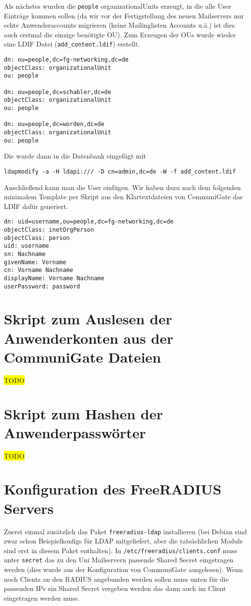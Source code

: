 \documentclass[11pt,a4paper,titlepage=firstiscover,headsepline,bibtotoc]{scrartcl} %
\newcommand{\hilight}[1]{\colorbox{yellow}{#1}} %
\begin{document}
Als nächstes wurden die \texttt{people} organizationalUnits erzeugt, in die alle User Einträge kommen sollen (da wir vor der Fertigstellung des neuen Mailservers nur echte Anwenderaccounts migrieren (keine Mailinglisten Accounts u.ä.) ist dies auch erstmal die einzige benötigte OU). Zum Erzeugen der OUs wurde wieder eine LDIF Datei (\texttt{add\_content.ldif}) erstellt.
\begin{lstlisting}
dn: ou=people,dc=fg-networking,dc=de
objectClass: organizationalUnit
ou: people

dn: ou=people,dc=schabler,dc=de
objectClass: organizationalUnit
ou: people

dn: ou=people,dc=worden,dc=de
objectClass: organizationalUnit
ou: people
\end{lstlisting}
Die wurde dann in die Datenbank eingefügt mit
\begin{lstlisting}
ldapmodify -a -H ldapi:/// -D cn=admin,dc=de -W -f add_content.ldif
\end{lstlisting}
Anschließend kann man die User einfügen. Wir haben dazu nach dem folgenden minimalem Template per Skript aus den Klartextdateien von CommuniGate das LDIF dafür generiert.
\begin{lstlisting}
dn: uid=username,ou=people,dc=fg-networking,dc=de
objectClass: inetOrgPerson
objectClass: person
uid: username
sn: Nachname
givenName: Vorname
cn: Vorname Nachname
displayName: Vorname Nachname
userPassword: password
\end{lstlisting}

\newpage
\section{Skript zum Auslesen der Anwenderkonten aus der CommuniGate Dateien}\label{sec:SkriptA}

\hilight{TODO}

\newpage
\section{Skript zum Hashen der Anwenderpasswörter}\label{sec:SkriptB}

\hilight{TODO}

\newpage
\section{Konfiguration des FreeRADIUS Servers}\label{sec:RADIUS-Konfig}
Zuerst einmal zusätzlich das Paket \texttt{freeradius-ldap} installieren (bei Debian sind zwar schon Beispielkonfigs für LDAP mitgeliefert, aber die tatsächlichen Module sind erst in diesem Paket enthalten). In \texttt{/etc/freeradius/clients.conf} muss unter \texttt{secret} das zu den Uni Mailservern passende Shared Secret eingetragen werden (dies wurde aus der Konfiguration von CommuniGate ausgelesen). Wenn noch Clients an den RADIUS angebunden werden sollen muss unten für die passenden IPs ein Shared Secret vergeben werden das dann auch im Client eingetragen werden muss.
\end{document}
